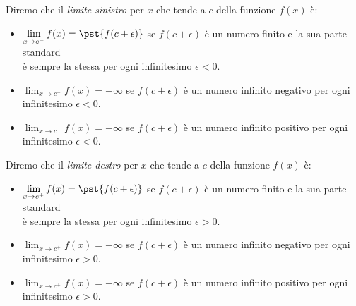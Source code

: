\begin{definizione}
Diremo che il \emph{limite sinistro} per \(x\) che tende a \(c\) 
della funzione \(f(x)\) è:
\noindent \begin{itemize}
\item 
\(\displaystyle \lim_{x \to c^-}f(x) = \pst{f(c+\epsilon)}\)
se \(f(c+\epsilon)\) è un numero finito e la sua parte standard \\
\hspace*{37.5mm} è sempre la stessa per ogni infinitesimo \(\epsilon < 0\).
\item 
\(\displaystyle \lim_{x \to c^-}f(x) = -\infty\)
se \(f(c+\epsilon)\) è un numero infinito negativo 
per ogni infinitesimo \(\epsilon  < 0\).
\item 
\(\displaystyle \lim_{x \to c^-}f(x) = +\infty\)
se \(f(c+\epsilon)\) è un numero infinito positivo 
per ogni infinitesimo \(\epsilon  < 0\).
\end{itemize}
\end{definizione}

\begin{definizione}
Diremo che il \emph{limite destro} per \(x\) che tende a \(c\) 
della funzione \(f(x)\) è:
\noindent \begin{itemize}
\item 
\(\displaystyle \lim_{x \to c^+}f(x) = \pst{f(c+\epsilon)}\)
se \(f(c+\epsilon)\) è un numero finito e la sua parte standard \\
\hspace*{37.5mm} è sempre la stessa per ogni infinitesimo \(\epsilon > 0\).
\item 
\(\displaystyle \lim_{x \to c^+}f(x) = -\infty\)
se \(f(c+\epsilon)\) è un numero infinito negativo 
per ogni infinitesimo \(\epsilon > 0\).
\item 
\(\displaystyle \lim_{x \to c^+}f(x) = +\infty\)
se \(f(c+\epsilon)\) è un numero infinito positivo 
per ogni infinitesimo \(\epsilon > 0\).
\end{itemize}
\end{definizione}


